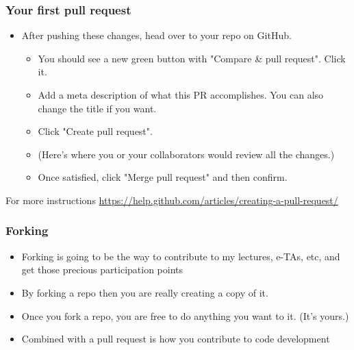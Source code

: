 \documentclass[
  shownotes,
  xcolor={svgnames},
  hyperref={colorlinks,citecolor=DarkBlue,linkcolor=DarkRed,urlcolor=DarkBlue}
  ]{beamer}
\begin{document}
\begin{frame}[fragile]
\frametitle{Your first pull request}

\begin{itemize}

\item After pushing these changes, head over to your repo on GitHub.
\bigskip
  \begin{itemize}
    \item You should see a new green button with "Compare \& pull request". Click it.
    \medskip
    \item Add a meta description of what this PR accomplishes. You can also change the title if you want.
    \medskip
    \item Click "Create pull request".
    \medskip
    \item (Here's where you or your collaborators would review all the changes.)
    \medskip
    \item Once satisfied, click "Merge pull request" and then confirm.
  \end{itemize}

\end{itemize}

\bigskip
For more instructions \url{https://help.github.com/articles/creating-a-pull-request/}

\end{frame}

\begin{frame}[fragile]
\frametitle{Forking}



\begin{itemize}
  \item Forking is going to be the way to contribute to my lectures, e-TAs, etc, and get those precious participation points
\bigskip
\item By forking a repo then you are really creating a copy of it.
\bigskip
\item Once you fork a repo, you are free to do anything you want to it. (It's yours.) 
  \bigskip
\item Combined with a pull request is how you contribute to code development
\end{itemize}



\end{frame}



\end{document}
